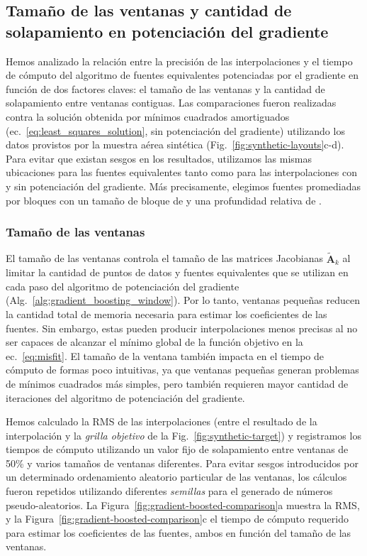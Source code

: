 

\subsection{Tamaño de las ventanas y cantidad de solapamiento en potenciación
del gradiente}
\label{sec:window_size_and_overlap}

Hemos analizado la relación entre la precisión de las interpolaciones y el
tiempo de cómputo del algoritmo de fuentes equivalentes potenciadas por el
gradiente en función de dos factores claves: el tamaño de las ventanas y la
cantidad de solapamiento entre ventanas contiguas.
Las comparaciones fueron realizadas contra la solución obtenida por mínimos
cuadrados amortiguados (ec.~\ref{eq:least_squares_solution}, sin potenciación
del gradiente) utilizando los datos provistos por la muestra aérea sintética
(Fig.~\ref{fig:synthetic-layouts}c-d).
Para evitar que existan sesgos en los resultados, utilizamos las mismas
ubicaciones para las fuentes equivalentes tanto como para las interpolaciones
con y sin potenciación del gradiente.
Más precisamente, elegimos fuentes promediadas por bloques con un tamaño de
bloque de
\BestAirborneBlockAveragedSourcesRelativeDepthSpacing\m{} y una profundidad
relativa de
\BestAirborneBlockAveragedSourcesRelativeDepthDepth\m{}.

\subsubsection{Tamaño de las ventanas}
\label{sec:window_size}

El tamaño de las ventanas controla el tamaño de las matrices Jacobianas
$\tilde{\mathbf{A}}_k$ al limitar la cantidad de puntos de datos y fuentes
equivalentes que se utilizan en cada paso del algoritmo de potenciación del
gradiente
(Alg.~\ref{alg:gradient_boosting_window}).
Por lo tanto, ventanas pequeñas reducen la cantidad total de memoria necesaria
para estimar los coeficientes de las fuentes.
Sin embargo, estas pueden producir interpolaciones menos precisas al no ser
capaces de alcanzar el mínimo global de la función objetivo en la
ec.~\ref{eq:misfit}.
El tamaño de la ventana también impacta en el tiempo de cómputo de formas poco
intuitivas, ya que ventanas pequeñas generan problemas de mínimos cuadrados más
simples, pero también requieren mayor cantidad de iteraciones del algoritmo de
potenciación del gradiente.

Hemos calculado la \ac{RMS} de las interpolaciones (entre el resultado de la
interpolación y la \emph{grilla objetivo} de la
Fig.~\ref{fig:synthetic-target}) y registramos los tiempos de cómputo
utilizando un valor fijo de solapamiento entre ventanas de 50\% y varios
tamaños de ventanas diferentes.
Para evitar sesgos introducidos por un determinado ordenamiento aleatorio
particular de las ventanas, los cálculos fueron repetidos utilizando diferentes
\emph{semillas} para el generado de números pseudo-aleatorios.
La Figura~\ref{fig:gradient-boosted-comparison}a
muestra la \ac{RMS}, y
la Figura~\ref{fig:gradient-boosted-comparison}c
el tiempo de cómputo requerido para estimar los coeficientes de las fuentes,
ambos en función del tamaño de las ventanas.

